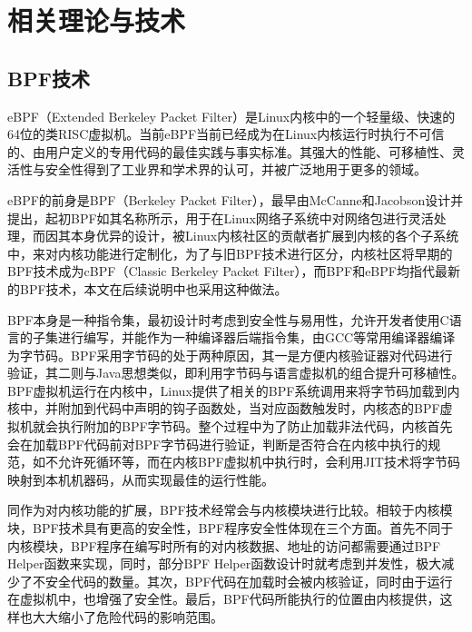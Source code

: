 \chapter{相关理论与技术}\label{chap:theories_tech}


\section{BPF技术}

eBPF（Extended Berkeley Packet Filter）是Linux内核中的一个轻量级、快速的64位的类RISC虚拟机\citep{sharaf2022extended}。当前eBPF当前已经成为在Linux内核运行时执行不可信的、由用户定义的专用代码的最佳实践与事实标准。其强大的性能、可移植性、灵活性与安全性得到了工业界和学术界的认可，并被广泛地用于更多的领域。

eBPF的前身是BPF（Berkeley Packet Filter），最早由McCanne和Jacobson设计并提出\citep{mccanne1993bsd}，起初BPF如其名称所示，用于在Linux网络子系统中对网络包进行灵活处理，而因其本身优异的设计，被Linux内核社区的贡献者扩展到内核的各个子系统中，来对内核功能进行定制化，为了与旧BPF技术进行区分，内核社区将早期的BPF技术成为cBPF（Classic Berkeley Packet Filter），而BPF和eBPF均指代最新的BPF技术，本文在后续说明中也采用这种做法。

BPF本身是一种指令集，最初设计时考虑到安全性与易用性，允许开发者使用C语言的子集进行编写，并能作为一种编译器后端指令集，由GCC等常用编译器编译为字节码\citep{ebpfguidence}。BPF采用字节码的处于两种原因，其一是方便内核验证器对代码进行验证，其二则与Java思想类似，即利用字节码与语言虚拟机的组合提升可移植性。BPF虚拟机运行在内核中，Linux提供了相关的BPF系统调用来将字节码加载到内核中，并附加到代码中声明的钩子函数处，当对应函数触发时，内核态的BPF虚拟机就会执行附加的BPF字节码。整个过程中为了防止加载非法代码，内核首先会在加载BPF代码前对BPF字节码进行验证，判断是否符合在内核中执行的规范，如不允许死循环等，而在内核BPF虚拟机中执行时，会利用JIT技术将字节码映射到本机机器码，从而实现最佳的运行性能。

同作为对内核功能的扩展，BPF技术经常会与内核模块进行比较。相较于内核模块，BPF技术具有更高的安全性，BPF程序安全性体现在三个方面。首先不同于内核模块，BPF程序在编写时所有的对内核数据、地址的访问都需要通过BPF Helper函数来实现，同时，部分BPF Helper函数设计时就考虑到并发性，极大减少了不安全代码的数量。其次，BPF代码在加载时会被内核验证，同时由于运行在虚拟机中，也增强了安全性。最后，BPF代码所能执行的位置由内核提供，这样也大大缩小了危险代码的影响范围。

